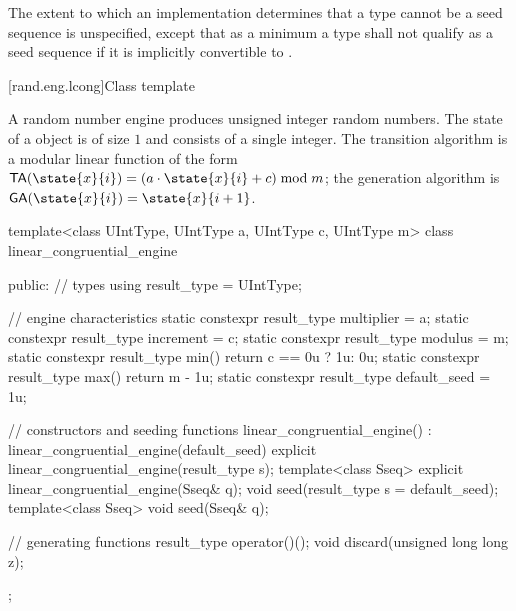 The extent to which an implementation determines that a type cannot be a seed sequence
is unspecified, except that as a minimum a type shall not qualify as a seed sequence
if it is implicitly convertible to .


[rand.eng.lcong]{Class template }%
%

\pnum
A  random number engine
produces unsigned integer random numbers.
The state%
of a  object 
is of size $1$
and consists of a single integer.
The transition algorithm%
%
is a modular linear function of the form
$\mathsf{TA}(\state{x}{i}) = (a \cdot \state{x}{i} + c) \bmod m$;
the generation algorithm%
%
is $\mathsf{GA}(\state{x}{i}) = \state{x}{i+1}$.

%
%
\begin{codeblock}
template<class UIntType, UIntType a, UIntType c, UIntType m>
  class linear_congruential_engine {
  public:
    // types
    using result_type = UIntType;

    // engine characteristics
    static constexpr result_type multiplier = a;
    static constexpr result_type increment = c;
    static constexpr result_type modulus = m;
    static constexpr result_type min() { return c == 0u ? 1u: 0u; }
    static constexpr result_type max() { return m - 1u; }
    static constexpr result_type default_seed = 1u;

    // constructors and seeding functions
    linear_congruential_engine() : linear_congruential_engine(default_seed) {}
    explicit linear_congruential_engine(result_type s);
    template<class Sseq> explicit linear_congruential_engine(Sseq& q);
    void seed(result_type s = default_seed);
    template<class Sseq> void seed(Sseq& q);

    // generating functions
    result_type operator()();
    void discard(unsigned long long z);
  };
\end{codeblock}

